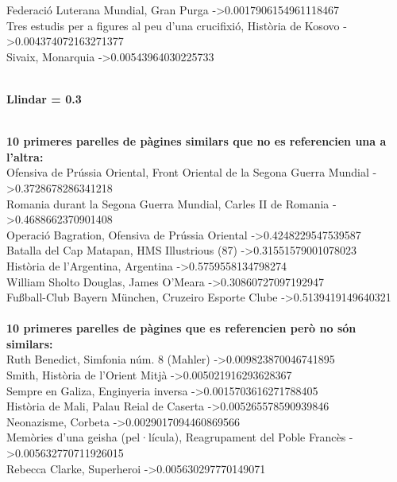 \documentclass{report}
\begin{document}
Federació Luterana Mundial, Gran Purga -\textgreater 0.0017906154961118467 \\ 
Tres estudis per a figures al peu d'una crucifixió, Història de Kosovo -\textgreater 0.004374072163271377 \\ 
Sivaix, Monarquia -\textgreater 0.00543964030225733 \\ 
 \\ 
\newline
\centerline{ \textbf{Llindar = 0.3} }
\newline
 \\ 
\textbf{10 primeres parelles de pàgines similars que no es referencien una a l'altra:} \\ 
Ofensiva de Prússia Oriental, Front Oriental de la Segona Guerra Mundial -\textgreater 0.3728678286341218 \\ 
Romania durant la Segona Guerra Mundial, Carles II de Romania -\textgreater 0.4688662370901408 \\ 
Operació Bagration, Ofensiva de Prússia Oriental -\textgreater 0.4248229547539587 \\ 
Batalla del Cap Matapan, HMS Illustrious (87) -\textgreater 0.31551579001078023 \\ 
Història de l'Argentina, Argentina -\textgreater 0.5759558134798274 \\ 
William Sholto Douglas, James O'Meara -\textgreater 0.30860727097192947 \\ 
Fußball-Club Bayern München, Cruzeiro Esporte Clube -\textgreater 0.5139419149640321 \\ 
 \\ 
\textbf{10 primeres parelles de pàgines que es referencien però no són similars:} \\ 
Ruth Benedict, Simfonia núm. 8 (Mahler) -\textgreater 0.009823870046741895 \\ 
Smith, Història de l'Orient Mitjà -\textgreater 0.005021916293628367 \\ 
Sempre en Galiza, Enginyeria inversa -\textgreater 0.0015703616271788405 \\ 
Història de Mali, Palau Reial de Caserta -\textgreater 0.005265578590939846 \\ 
Neonazisme, Corbeta -\textgreater 0.0029017094460869566 \\ 
Memòries d'una geisha (pel·lícula), Reagrupament del Poble Francès -\textgreater 0.005632770711926015 \\ 
Rebecca Clarke, Superheroi -\textgreater 0.005630297770149071 \\ 
\end{document}
